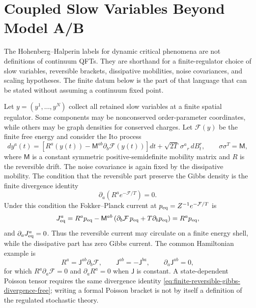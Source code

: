 \section{Coupled Slow Variables Beyond Model A/B}
\label{sec:finite-coupled-slow-variable-data}

The Hohenberg--Halperin labels for dynamic critical phenomena are not
definitions of continuum QFTs.  They are shorthand for a finite-regulator
choice of slow variables, reversible brackets, dissipative mobilities, noise
covariances, and scaling hypotheses.  The finite datum below is the part of
that language that can be stated without assuming a continuum fixed point.

Let \(y=(y^1,\ldots,y^N)\) collect all retained slow variables at a finite
spatial regulator.  Some components may be nonconserved order-parameter
coordinates, while others may be graph densities for conserved charges.  Let
\(\mathcal F(y)\) be the finite free energy and consider the Ito process
\begin{equation}
  dy^a(t)
  =
  \left[
    R^a(y(t))
    -\mathsf M^{ab}\partial_b\mathcal F(y(t))
  \right]dt
  +\sqrt{2T}\,\sigma^a{}_r\,dB^r_t,
  \qquad
  \sigma\sigma^T=\mathsf M ,
  \label{eq:finite-coupled-slow-variable-sde}
\end{equation}
where \(\mathsf M\) is a constant symmetric positive-semidefinite mobility
matrix and \(R\) is the reversible drift.  The noise covariance is again
fixed by the dissipative mobility.  The condition that the reversible part
preserve the Gibbs density is the finite divergence identity
\begin{equation}
  \partial_a
  \left(
    R^a e^{-\mathcal F/T}
  \right)
  =
  0 .
  \label{eq:finite-reversible-gibbs-divergence-free}
\end{equation}
Under this condition the Fokker--Planck current at
\(p_{\rm eq}=Z^{-1}e^{-\mathcal F/T}\) is
\begin{equation}
  J^a_{\rm eq}
  =
  R^a p_{\rm eq}
  -
  \mathsf M^{ab}
  \left(
    \partial_b\mathcal F\,p_{\rm eq}
    +
    T\partial_b p_{\rm eq}
  \right)
  =
  R^a p_{\rm eq},
  \label{eq:finite-coupled-gibbs-current}
\end{equation}
and \(\partial_aJ^a_{\rm eq}=0\).  Thus the reversible current may circulate
on a finite energy shell, while the dissipative part has zero Gibbs current.
The common Hamiltonian example is
\begin{equation}
  R^a=\mathsf J^{ab}\partial_b\mathcal F,
  \qquad
  \mathsf J^{ab}=-\mathsf J^{ba},
  \qquad
  \partial_a\mathsf J^{ab}=0 ,
  \label{eq:finite-constant-poisson-reversible-drift}
\end{equation}
for which \(R^a\partial_a\mathcal F=0\) and \(\partial_aR^a=0\) when
\(\mathsf J\) is constant.  A state-dependent Poisson tensor requires the
same divergence identity \eqref{eq:finite-reversible-gibbs-divergence-free};
writing a formal Poisson bracket is not by itself a definition of the
regulated stochastic theory.

